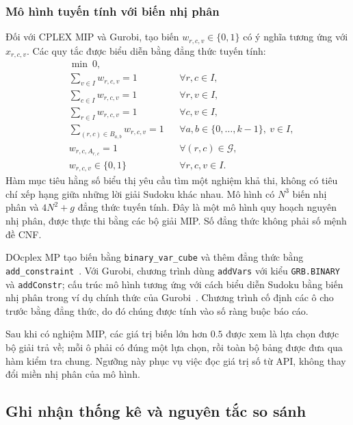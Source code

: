 \documentclass[a4paper,fleqn]{cas-sc}
\begin{document}
\subsubsection{Mô hình tuyến tính với biến nhị phân}

Đối với CPLEX MIP và Gurobi, tạo biến $w_{r,c,v}\in\{0,1\}$ có ý nghĩa
tương ứng với $x_{r,c,v}$. Các quy tắc được biểu diễn bằng đẳng thức
tuyến tính:
\nopagebreak[4]
\begin{equation}
\begin{aligned}
 &\min\ 0,\\
 &\sum_{v\in I}w_{r,c,v}=1
     &&\forall r,c\in I,\\
 &\sum_{c\in I}w_{r,c,v}=1
     &&\forall r,v\in I,\\
 &\sum_{r\in I}w_{r,c,v}=1
     &&\forall c,v\in I,
 \\
 &\sum_{(r,c)\in B_{a,b}}w_{r,c,v}=1
     &&\forall a,b\in\{0,\ldots,k-1\},\ v\in I,\\
 &w_{r,c,A_{r,c}}=1
     &&\forall(r,c)\in\mathcal{G},\\
 &w_{r,c,v}\in\{0,1\}
     &&\forall r,c,v\in I.
\end{aligned}
\label{eq:method-mip-model}
\end{equation}
Hàm mục tiêu hằng số biểu thị yêu cầu tìm một nghiệm khả thi, không có
tiêu chí xếp hạng giữa những lời giải Sudoku khác nhau. Mô hình có
$N^3$ biến nhị phân và $4N^2+g$ đẳng thức tuyến tính.
Đây là một mô hình quy hoạch nguyên nhị phân, được thực thi bằng các
bộ giải MIP. Số đẳng thức không phải số mệnh đề CNF.

DOcplex MP tạo biến bằng \texttt{binary\_var\_cube} và thêm đẳng thức
bằng \texttt{add\_constraint}~.
Với Gurobi, chương trình dùng \texttt{addVars} với kiểu
\texttt{GRB.BINARY} và \texttt{addConstr}; cấu trúc mô hình tương ứng
với cách biểu diễn Sudoku bằng biến nhị phân trong ví dụ chính thức
của Gurobi~. Chương trình cố định các ô cho trước
bằng đẳng thức, do đó chúng được tính vào số ràng buộc báo cáo.

Sau khi có nghiệm MIP, các giá trị biến lớn hơn $0.5$ được xem là lựa
chọn được bộ giải trả về; mỗi ô phải có đúng một lựa chọn, rồi toàn bộ
bảng được đưa qua hàm kiểm tra chung. Ngưỡng này phục vụ việc đọc giá
trị số từ API, không thay đổi miền nhị phân của mô hình.

\subsection{Ghi nhận thống kê và nguyên tắc so sánh}
\end{document}
